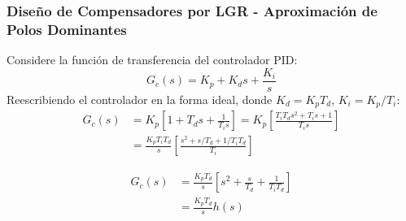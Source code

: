 \documentclass[aspectratio=169,handout]{beamer}
\theoremstyle{definition}
\theoremstyle{plain}
\theoremstyle{remark}
\begin{document}
\begin{frame}[c]\frametitle{Diseño de Compensadores por LGR - Aproximación de Polos Dominantes}
	Considere la función de transferencia del controlador PID:
	\begin{equation*}
		G_c(s) = K_p + K_d s + \frac{K_i}{s}
	\end{equation*}
	Reescribiendo el controlador en la forma ideal, donde $K_d = K_p T_d$, $K_i = K_p/T_i$:
	\begin{align*}
		G_c(s) &= K_p \left[1 + T_d s + \frac{1}{T_i s} \right] = K_p \left[ \frac{T_i T_d s^2 + T_i s + 1}{T_i s} \right]\\
		&= \frac{K_p T_i T_d}{s} \left[\frac{s^2 + s/T_d + 1/T_i T_d}{T_i} \right]
	\end{align*}
		
	\begin{align}
		G_c(s) &= \frac{K_p T_d}{s} \left[s^2 + \frac{s}{T_d} + \frac{1}{T_i T_d} \right]\nonumber\\
		&= \frac{K_p T_d}{s} h(s)\label{eq:pid_titd}
	\end{align}
\end{frame}
\end{document}
